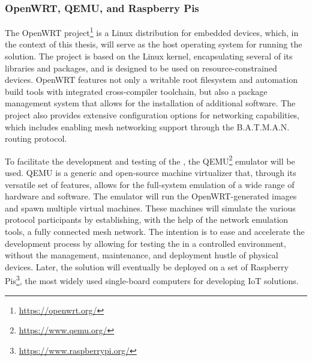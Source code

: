 \subsubsection{OpenWRT, QEMU, and Raspberry Pis}

The OpenWRT project\footnote{\url{https://openwrt.org/}} is a Linux distribution for embedded devices, which, in the context of this thesis, will serve as the host operating system for running the \poc{} solution. The project is based on the Linux kernel, encapsulating several of its libraries and packages, and is designed to be used on resource-constrained devices. OpenWRT features not only a writable root filesystem and automation build tools with integrated cross-compiler toolchain, but also a package management system that allows for the installation of additional software. The project also provides extensive configuration options for networking capabilities, which includes enabling mesh networking support through the B.A.T.M.A.N. routing protocol. 

To facilitate the development and testing of the \poc{}, the QEMU\footnote{\url{https://www.qemu.org/}} emulator will be used. QEMU is a generic and open-source machine virtualizer that, through its versatile set of features, allows for the full-system emulation of a wide range of hardware and software. The emulator will run the OpenWRT-generated images and spawn multiple virtual machines. These machines will simulate the various protocol participants by establishing, with the help of the network emulation tools, a fully connected mesh network. The intention is to ease and accelerate the development process by allowing for testing the \poc{} in a controlled environment, without the management, maintenance, and deployment hustle of physical devices. Later, the solution will eventually be deployed on a set of Raspberry Pis\footnote{\url{https://www.raspberrypi.org/}}, the most widely used single-board computers for developing IoT solutions.

